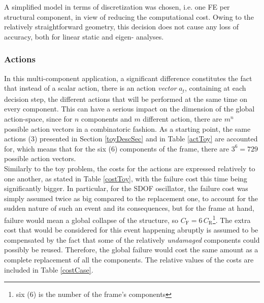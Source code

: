 A simplified model in terms of discretization was chosen, i.e. one \gls{FE} per structural component, in view of reducing the computational cost. Owing to the relatively straightforward geometry, this decision does not cause any loss of accuracy, both for linear static and  eigen- analyses.


\subsubsection{Actions}

In this multi-component application, a significant difference constitutes the fact that instead of a scalar action, there is an action \textit{vector} $\underline{a_t}$, containing at each decision step, the different actions that will be performed at the same time on every component. This can have a serious impact on the dimension of the global action-space, since for $n$ components and $m$ different action, there are $m^n$ possible action vectors in a combinatoric fashion. As a starting point, the same actions ($3$) presented in Section \ref{toyDescSec} and in Table \ref{actToy} are accounted for, which means that for the six ($6$) components of the frame, there are $3^6 = 729$ possible action vectors.\\

Similarly to the toy problem, the costs for the actions are expressed relatively to one another, as stated in Table \ref{costToy}, with the failure cost this time being significantly bigger. In particular, for the \gls{SDOF} oscillator, the failure cost was simply assumed twice as big compared to the replacement one, to account for the sudden nature of such an event and its consequences, but for the frame at hand, failure would mean a global collapse of the structure, so $C_{\text{F}} = 6 \, C_{\text{R}}$\footnote{six (6) is the number of the frame's components}. The extra cost that would be considered for this event happening abruptly is assumed to be compensated by the fact  that some of the relatively \textit{undamaged} components could possibly be reused. Therefore, the global failure would cost the same amount as a complete replacement of all the components. The relative values of the costs are included in Table \ref{costCase}. 

